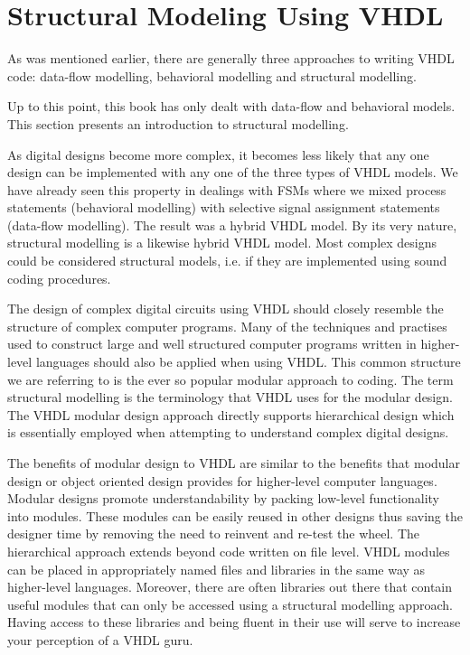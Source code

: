 %
%
%
\chapter{Structural Modeling Using VHDL}
As was mentioned earlier, there are generally three approaches to writing VHDL code: data-flow modelling, behavioral modelling and structural modelling.

Up to this point, this book has only dealt with data-flow and behavioral models. This section presents an introduction to structural modelling. 

As digital designs become more complex, it becomes less likely that any one design can be implemented with any one of the three types of VHDL models. We have already seen this property in dealings with FSMs where we mixed process statements (behavioral modelling) with selective signal assignment statements (data-flow modelling). The result was a hybrid VHDL model. By its very nature, structural modelling is a likewise hybrid VHDL model. Most complex designs could be considered structural models, i.e. if they are implemented using sound coding procedures. 

The design of complex digital circuits using VHDL should closely resemble the structure of complex computer programs. Many of the techniques and practises used to construct large and well structured computer programs written in higher-level languages should also be applied when using VHDL. This common structure we are referring to is the ever so popular modular approach to coding. The term structural modelling is the terminology that VHDL uses for the modular design. The VHDL modular design approach directly supports hierarchical design which is essentially employed when attempting to understand complex digital designs. 

The benefits of modular design to VHDL are similar to the benefits that modular design or object oriented design provides for higher-level computer languages. Modular designs promote understandability by packing low-level functionality into modules. These modules can be easily reused in other designs thus saving the designer time by removing the need to reinvent and re-test the wheel. The hierarchical approach extends beyond code written on file level. VHDL modules can be placed in appropriately named files and libraries in the same way as higher-level languages. Moreover, there are often libraries out there that contain useful modules that can only be accessed using a structural modelling approach. Having access to these libraries and being fluent in their use will serve to increase your perception of a VHDL guru.

